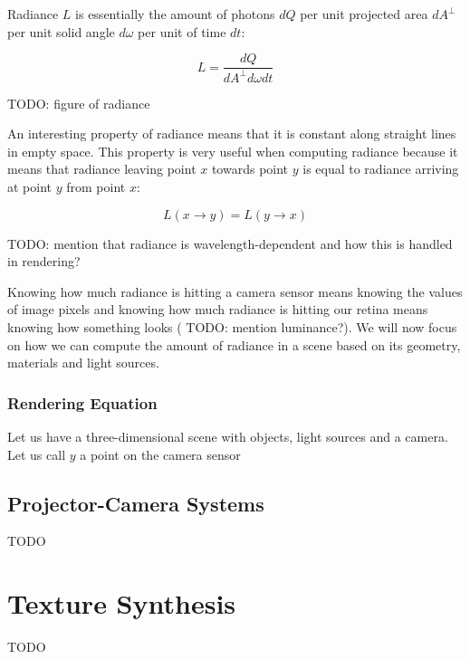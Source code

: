 Radiance \(L\) is essentially the amount of photons \(dQ\) per unit projected area \(dA^\perp \) per unit solid angle \(d\omega\) per unit of time \(dt\):

\[
    L = \frac{dQ}{dA^\perp d\omega dt}
\]

{\color{red} TODO: figure of radiance}

An interesting property of radiance means that it is constant along straight lines in empty space. This property is very useful when computing radiance because it means that radiance leaving point \(x\) towards point \(y\) is equal to radiance arriving at point \(y\) from point \(x\):

\[
    L(x \rightarrow y) = L(y \rightarrow x)
\]

{\color{red} TODO: mention that radiance is wavelength-dependent and how this is handled in rendering?}

Knowing how much radiance is hitting a camera sensor means knowing the values of image pixels and knowing how much radiance is hitting our retina means knowing how something looks ({\color{red} TODO: mention luminance?}). We will now focus on how we can compute the amount of radiance in a scene based on its geometry, materials and light sources.

\subsubsection{Rendering Equation}
\label{section:background-projection_mapping-light_transport-rendering_equation}

Let us have a three-dimensional scene with objects, light sources and a camera. Let us call \(y\) a point on the camera sensor

\subsection{Projector-Camera Systems}
\label{section:background-projection_mapping-procams}

{\color{red} TODO}

\section{Texture Synthesis}
\label{section:background-texture_synthesis}

{\color{red} TODO}